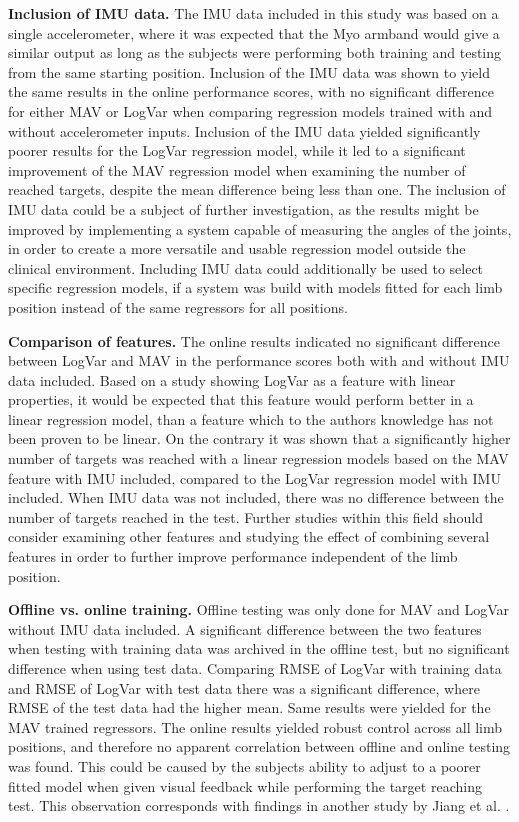 \begin{multicols}{2}
\textbf{Inclusion of IMU data.} The IMU data included in this study was based on a single accelerometer, where it was expected that the Myo armband would give a similar output as long as the subjects were performing both training and testing from the same starting position. Inclusion of the IMU data was shown to yield the same results in the online performance scores, with no significant difference for either MAV or LogVar when comparing regression models trained with and without accelerometer inputs. Inclusion of the IMU data yielded significantly poorer results for the LogVar regression model, while it led to a significant improvement of the MAV regression model when examining the number of reached targets, despite the mean difference being less than one. The inclusion of IMU data could be a subject of further investigation, as the results might be improved by implementing a system capable of measuring the angles of the joints, in order to create a more versatile and usable regression model outside the clinical environment. Including IMU data could additionally be used to select specific regression models, if a system was build with models fitted for each limb position instead of the same regressors for all positions.

\textbf{Comparison of features.} The online results indicated no significant difference between LogVar and MAV in the performance scores both with and without IMU data included. Based on a study \cite{hahne2014} showing LogVar as a feature with linear properties, it would be expected that this feature would perform better in a linear regression model, than a feature which to the authors knowledge has not been proven to be linear. On the contrary it was shown that a significantly higher number of targets was reached with a linear regression models based on the MAV feature with IMU included, compared to the LogVar regression model with IMU included. When IMU data was not included, there was no difference between the number of targets reached in the test.
Further studies within this field should consider examining other features and studying the effect of combining several features in order to further improve performance independent of the limb position.

\textbf{Offline vs. online training.} Offline testing was only done for MAV and LogVar without IMU data included. A significant difference between the two features when testing with training data was archived in the offline test, but no significant difference when using test data. Comparing RMSE of LogVar with training data and RMSE of LogVar with test data there was a significant difference, where RMSE of the test data had the higher mean. Same results were yielded for the MAV trained regressors. The online results yielded robust control across all limb positions, and therefore no apparent correlation between offline and online testing was found. This could be caused by the subjects ability to adjust to a poorer fitted model when given visual feedback while performing the target reaching test. This observation corresponds with findings in another study by Jiang et al. \cite{jiang2010}.


\end{multicols}
